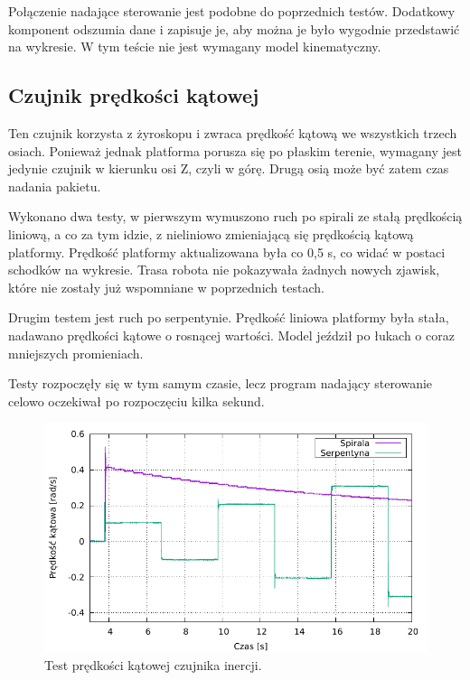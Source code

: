	Połączenie nadające sterowanie jest podobne do poprzednich testów.
	Dodatkowy komponent odszumia dane i zapisuje je, aby można je było wygodnie przedstawić na wykresie.
	W tym teście nie jest wymagany model kinematyczny.
	
	\subsection{Czujnik prędkości kątowej}
		Ten czujnik korzysta z żyroskopu i zwraca prędkość kątową we wszystkich trzech osiach.
		Ponieważ jednak platforma porusza się po płaskim terenie, wymagany jest jedynie czujnik w kierunku osi Z, czyli w górę.
		Drugą osią może być zatem czas nadania pakietu.
		
		Wykonano dwa testy, w pierwszym wymuszono ruch po spirali ze stałą prędkością liniową, a co za tym idzie, z nieliniowo zmieniającą się prędkością kątową platformy.
		Prędkość platformy aktualizowana była co 0,5 s, co widać w postaci schodków na wykresie.
		Trasa robota nie pokazywała żadnych nowych zjawisk, które nie zostały już wspomniane w poprzednich testach.
		
		Drugim testem jest ruch po serpentynie.
		Prędkość liniowa platformy była stała, nadawano prędkości kątowe o rosnącej wartości. Model jeździł po łukach o coraz mniejszych promieniach.
		
		Testy rozpoczęły się w tym samym czasie, lecz program nadający sterowanie celowo oczekiwał po rozpoczęciu kilka sekund.
		
		\begin{figure}[H]
		\centering
			\includegraphics[width=\textwidth]{plots/wewucho_angular.pdf}
			\caption{Test prędkości kątowej czujnika inercji.}
			\label{plot:wewucho_angular}
		\end{figure}
		
